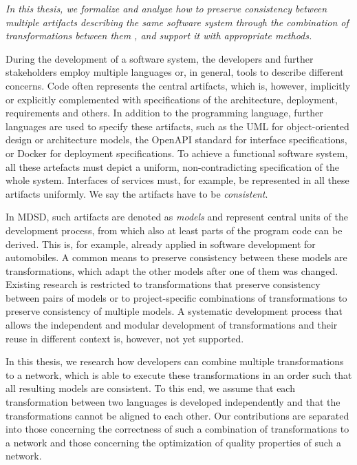 \emph{In this thesis, we formalize and analyze how to preserve consistency between multiple artifacts describing the same software system through the combination of transformations between them%
, and support it with appropriate methods.}

During the development of a software system, the developers and further stakeholders employ multiple languages or, in general, tools to describe different concerns.
Code often represents the central artifacts, which is, however, implicitly or explicitly complemented with specifications of the architecture, deployment, requirements and others.
In addition to the programming language, further languages are used to specify these artifacts, such as the \acrshort{UML} for object-oriented design or architecture models, the OpenAPI standard for interface specifications, or Docker for deployment specifications.
To achieve a functional software system, all these artefacts must depict a uniform, non-contradicting specification of the whole system.
Interfaces of services must, for example, be represented in all these artifacts uniformly.
We say the artifacts have to be \emph{consistent}.

In \acrlong{MDSD}, such artifacts are denoted as \emph{models} and represent central units of the development process, from which also at least parts of the program code can be derived.
This is, for example, already applied in software development for automobiles.
A common means to preserve consistency between these models are transformations, which adapt the other models after one of them was changed.
Existing research is restricted to transformations that preserve consistency between pairs of models or to project-specific combinations of transformations to preserve consistency of multiple models.
A systematic development process that allows the independent and modular development of transformations and their reuse in different context is, however, not yet supported.

In this thesis, we research how developers can combine multiple transformations to a network, which is able to execute these transformations in an order such that all resulting models are consistent.
To this end, we assume that each transformation between two languages is developed independently and that the transformations cannot be aligned to each other.
Our contributions are separated into those concerning the correctness of such a combination of transformations to a network and those concerning the optimization of quality properties of such a network.

